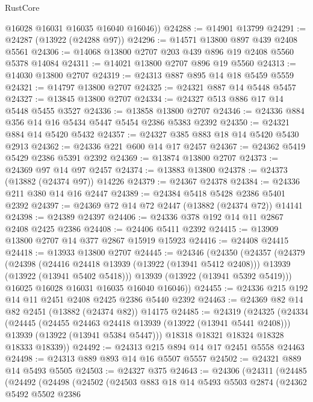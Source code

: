 \begin{lexlean}{RustCore}
\begin{coremodule}
        @16028
        @16031
        @16035
        @16040
        @16046))
@24288 := @14901 @13799
@24291 := @24287 (@13922 (@24288 @97))
@24296 := @14571 @13800 @897 @439 @2408 @5561
@24306 := @14068 @13800 @2707 @203 @439 @896 @19 @2408 @5560 @5378 @14084
@24311 := @14021 @13800 @2707 @896 @19 @5560
@24313 := @14030 @13800 @2707
@24319 := @24313 @887 @895 @14 @18 @5459 @5559
@24321 := @14797 @13800 @2707
@24325 := @24321 @887 @14 @5448 @5457
@24327 := @13845 @13800 @2707
@24334 := @24327 @513 @886 @17 @14 @5448 @5455 @3527
@24336 := @13858 @13800 @2707
@24346 := @24336 @884 @356 @14 @16 @5434 @5447 @5454 @2386 @5383 @2392
@24350 := @24321 @884 @14 @5420 @5432
@24357 := @24327 @385 @883 @18 @14 @5420 @5430 @2913
@24362 := @24336 @221 @600 @14 @17 @2457
@24367 := @24362 @5419 @5429 @2386 @5391 @2392
@24369 := @13874 @13800 @2707
@24373 := @24369 @97 @14 @97 @2457
@24374 := @13883 @13800
@24378 := @24373 (@13882 (@24374 @97)) @14226
@24379 := @24367 @24378
@24384 := @24336 @211 @380 @14 @16 @2447
@24389 := @24384 @5418 @5428 @2386 @5401 @2392
@24397 := @24369 @72 @14 @72 @2447 (@13882 (@24374 @72)) @14141
@24398 := @24389 @24397
@24406 := @24336 @378 @192 @14 @11 @2867 @2408 @2425 @2386
@24408 := @24406 @5411 @2392
@24415 := @13909 @13800 @2707 @14 @377 @2867 @15919 @15923
@24416 := @24408 @24415
@24418 := @13933 @13800 @2707
@24445 := @24346
    (@24350
      (@24357
        (@24379
          (@24398
            (@24416 @24418 @13939 (@13922 (@13941 @5412 @2408)))
            @13939
            (@13922 (@13941 @5402 @5418)))
          @13939
          (@13922 (@13941 @5392 @5419)))
        @16025
        @16028
        @16031
        @16035
        @16040
        @16046))
@24455 := @24336 @215 @192 @14 @11 @2451 @2408 @2425 @2386 @5440 @2392
@24463 := @24369 @82 @14 @82 @2451 (@13882 (@24374 @82)) @14175
@24485 := @24319
    (@24325
      (@24334
        (@24445
          (@24455 @24463 @24418 @13939 (@13922 (@13941 @5441 @2408)))
          @13939
          (@13922 (@13941 @5384 @5447)))
        @18318
        @18321
        @18324
        @18328
        @18333
        @18339))
@24492 := @24313 @215 @894 @14 @17 @2451 @5558 @24463
@24498 := @24313 @889 @893 @14 @16 @5507 @5557
@24502 := @24321 @889 @14 @5493 @5505
@24503 := @24327 @375
@24643 := @24306
    (@24311
      (@24485
        (@24492
          (@24498
            (@24502
              (@24503
                @883
                @18
                @14
                @5493
                @5503
                @2874
                (@24362
                  @5492
                  @5502
                  @2386

\end{coremodule}
\end{lexlean}
